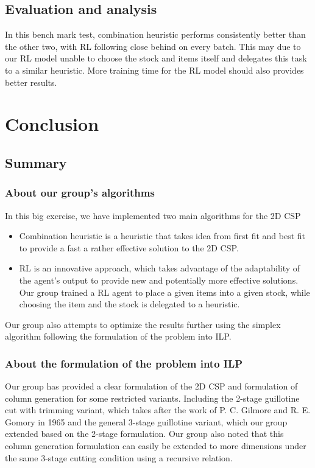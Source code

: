 \documentclass[a4paper]{article}
\begin{document}
    \subsection{Evaluation and analysis}
    In this bench mark test, combination heuristic performs consistently better than the other two, with RL following close behind on every batch. This may due to our RL model unable to choose the stock and items itself and delegates this task to a similar heuristic. More training time for the RL model should also provides better results. 
    
    \pagebreak
    \section{Conclusion}
    \subsection{Summary}
    \subsubsection{About our group's algorithms}
    In this big exercise, we have implemented two main algorithms for the 2D CSP
    \begin{itemize}
        \item Combination heuristic is a heuristic that takes idea from first fit and best fit to provide a fast a rather effective solution to the 2D CSP. 
        \item RL is an innovative approach, which takes advantage of the adaptability of the agent's output to provide new and potentially more effective solutions. Our group trained a RL agent to place a given items into a given stock, while choosing the item and the stock is delegated to a heuristic.
    \end{itemize}
    Our group also attempts to optimize the results further using the simplex algorithm following the formulation of the problem into ILP.
    
    \subsubsection{About the formulation of the problem into ILP} 
    Our group has provided a clear formulation of the 2D CSP and formulation of column generation for some restricted variants. Including the 2-stage guillotine cut with trimming variant, which takes after the work of P. C. Gilmore and R. E. Gomory in 1965 \cite{f6bab824-25b0-39e2-8f1e-13aaf2701321} and the general 3-stage guillotine variant, which our group extended based on the 2-stage formulation. Our group also noted that this column generation formulation can easily be extended to more dimensions under the same 3-stage cutting condition using a recursive relation.
\end{document}

